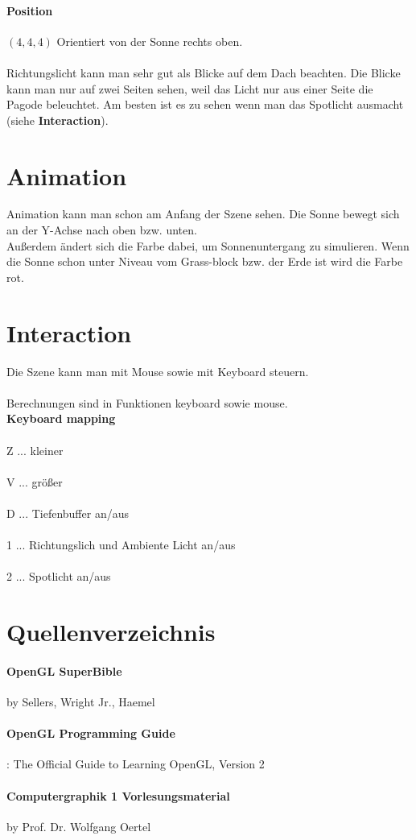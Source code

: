 \documentclass[12pt]{article}
\begin{document}
\paragraph{Position} $(4,4,4)$ Orientiert von der Sonne rechts oben.\\\\ 
Richtungslicht kann man sehr gut als Blicke auf dem Dach beachten. Die Blicke kann man nur auf zwei Seiten sehen, weil das Licht nur aus einer Seite die Pagode beleuchtet. Am besten ist es zu sehen wenn man das Spotlicht ausmacht (siehe \textbf{Interaction}).

\pagebreak

\section{Animation}
Animation kann man schon am Anfang der Szene sehen. Die Sonne bewegt sich an der Y-Achse nach oben bzw. unten. \\
Außerdem ändert sich die Farbe dabei, um Sonnenuntergang zu simulieren.
Wenn die Sonne schon unter Niveau vom Grass-block bzw. der Erde ist wird die Farbe rot.

\pagebreak

\section{Interaction}
Die Szene kann man mit Mouse sowie mit Keyboard steuern.\\\\
Berechnungen sind in Funktionen keyboard sowie mouse.
\\
\textbf{Keyboard mapping} \\\\
Z ... kleiner \\\\
V ... größer \\\\
D ... Tiefenbuffer an/aus \\\\
1 ... Richtungslich und Ambiente Licht an/aus \\\\
2 ... Spotlicht an/aus

\section{Quellenverzeichnis}
\paragraph{OpenGL SuperBible} by Sellers, Wright Jr., Haemel

\paragraph{OpenGL Programming Guide}: The Official Guide to Learning OpenGL, Version 2 

\paragraph{Computergraphik 1 Vorlesungsmaterial} by Prof. Dr. Wolfgang Oertel 
\end{document}
